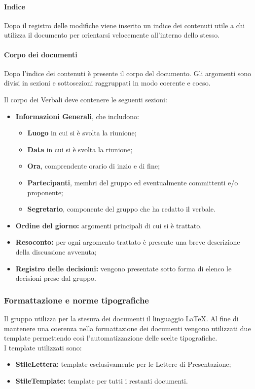\paragraph*{Indice}
Dopo il registro delle modifiche viene inserito un indice dei contenuti utile a chi utilizza il documento per orientarsi velocemente all'interno dello stesso.

\paragraph*{Corpo dei documenti}
Dopo l'indice dei contenuti è presente il corpo del documento. Gli argomenti sono divisi in sezioni e sottosezioni raggruppati in modo coerente e coeso.

Il corpo dei Verbali deve contenere le seguenti sezioni:
\begin{itemize}
	\item \textbf{Informazioni Generali}, che includono:
		\begin{itemize}
			\item \textbf{Luogo} in cui si è svolta la riunione;
			\item \textbf{Data} in cui si è svolta la riunione;
			\item \textbf{Ora}, comprendente orario di inzio e di fine;
			\item \textbf{Partecipanti}, membri del gruppo ed eventualmente committenti e/o proponente;
			\item \textbf{Segretario}, componente del gruppo che ha redatto il verbale.
		\end{itemize}
	\item \textbf{Ordine del giorno: }argomenti principali di cui si è trattato.
	\item \textbf{Resoconto: }per ogni argomento trattato è presente una breve descrizione della discussione avvenuta;
	\item \textbf{Registro delle decisioni:} vengono presentate sotto forma di elenco le decisioni prese dal gruppo.
\end{itemize}

\subsubsection{Formattazione e norme tipografiche}
Il gruppo utilizza per la stesura dei documenti il linguaggio \LaTeX. Al fine di mantenere una coerenza nella formattazione dei documenti vengono utilizzati due template permettendo così l'automatizzazione delle scelte tipografiche. \\
I template utilizzati sono:
\begin{itemize}
	\item \textbf{StileLettera: }template esclusivamente per le Lettere di Presentazione;
	\item \textbf{StileTemplate: }template per tutti i restanti documenti.
\end{itemize}

